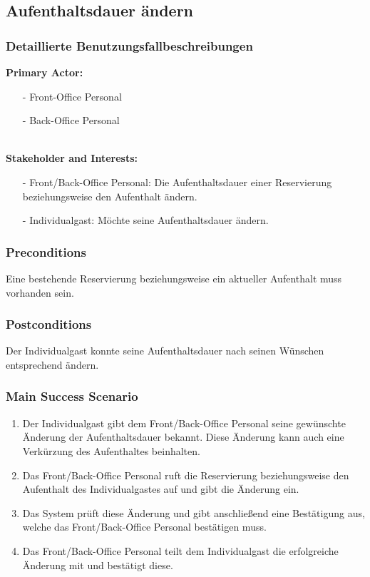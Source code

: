 \documentclass[./detailed_overview_usecases.tex]{subfiles}
\begin{document}
    \subsection{Aufenthaltsdauer ändern}
    \subsubsection{Detaillierte Benutzungsfallbeschreibungen}
    \textbf{Primary Actor:}
    \begin{itemize}
        \item[-] Front-Office Personal
        \item[-] Back-Office Personal
    \end{itemize}
    \\
    \textbf{Stakeholder and Interests:}
    \begin{itemize}
        \item[-] Front/Back-Office Personal: Die Aufenthaltsdauer einer Reservierung beziehungsweise den Aufenthalt ändern.
        \item[-] Individualgast: Möchte seine Aufenthaltsdauer ändern.
    \end{itemize}

    \subsubsection*{Preconditions}
	Eine bestehende Reservierung beziehungsweise ein aktueller Aufenthalt muss vorhanden sein.
	
    \subsubsection*{Postconditions}
    Der Individualgast konnte seine Aufenthaltsdauer nach seinen Wünschen entsprechend ändern.
	
    \subsubsection*{Main Success Scenario}
    \begin{enumerate}
        \item Der Individualgast gibt dem Front/Back-Office Personal seine gewünschte Änderung der Aufenthaltsdauer bekannt. Diese Änderung kann auch eine Verkürzung des Aufenthaltes beinhalten.
        \item Das Front/Back-Office Personal ruft die Reservierung beziehungsweise den Aufenthalt des Individualgastes auf und gibt die Änderung ein.
	    \item Das System prüft diese Änderung und gibt anschließend eine Bestätigung aus, welche das Front/Back-Office Personal bestätigen muss.
	    \item Das Front/Back-Office Personal teilt dem Individualgast die erfolgreiche Änderung mit und bestätigt diese.
    \end{enumerate}
\end{document}
